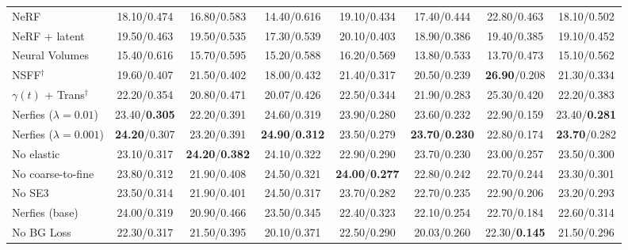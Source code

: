 \begin{enrichment}
\begin{enrichment}
\begin{table}[H]
{\begin{minipage}{0.80\textwidth}
{\begin{tabular}{@{}lccccccc@{}}
                            \midrule
                            NeRF~\cite{mildenhall2020_nerf}                 & 18.10/0.474 & 16.80/0.583 & 14.40/0.616 & 19.10/0.434 & 17.40/0.444 & 22.80/0.463 & 18.10/0.502 \\
                            NeRF + latent                                   & 19.50/0.463 & 19.50/0.535 & 17.30/0.539 & 20.10/0.403 & 18.90/0.386 & 19.40/0.385 & 19.10/0.452 \\
                            Neural Volumes~\cite{lombardi2019_neuralvolumes}& 15.40/0.616 & 15.70/0.595 & 15.20/0.588 & 16.20/0.569 & 13.80/0.533 & 13.70/0.473 & 15.10/0.562 \\
                            NSFF$^\dagger$~\cite{li2021_neural}             & 19.60/0.407 & 21.50/0.402 & 18.00/0.432  & 21.40/0.317 & 20.50/0.239 & \textbf{26.90}/0.208 & 21.30/0.334 \\
                            $\gamma(t)$ + Trans$^\dagger$~\cite{pumarola2021_dnerf}
                            & 22.20/0.354 & 20.80/0.471 & 20.07/0.426 & 22.50/0.344 & 21.90/0.283 & 25.30/0.420 & 22.20/0.383 \\
                            Nerfies ($\lambda{=}0.01$)                      & 23.40/\textbf{0.305} & 22.20/0.391 & 24.60/0.319 & 23.90/0.280 & 23.60/0.232 & 22.90/0.159 & 23.40/\textbf{0.281} \\
                            Nerfies ($\lambda{=}0.001$)                     & \textbf{24.20}/0.307 & 23.20/0.391 & \textbf{24.90}/\textbf{0.312} & 23.50/0.279 & \textbf{23.70}/\textbf{0.230} & 22.80/0.174 & \textbf{23.70}/0.282 \\
                            No elastic                                      & 23.10/0.317 & \textbf{24.20}/\textbf{0.382} & 24.10/0.322 & 22.90/0.290 & 23.70/0.230 & 23.00/0.257 & 23.50/0.300 \\
                            No coarse-to-fine                               & 23.80/0.312 & 21.90/0.408 & 24.50/0.321 & \textbf{24.00}/\textbf{0.277} & 22.80/0.242 & 22.70/0.244 & 23.30/0.301 \\
                            No SE3                                          & 23.50/0.314 & 21.90/0.401 & 24.50/0.317 & 23.70/0.282 & 22.70/0.235 & 22.90/0.206 & 23.20/0.293 \\
                            Nerfies (base)                                  & 24.00/0.319 & 20.90/0.466 & 23.50/0.345 & 22.40/0.323 & 22.10/0.254 & 22.70/0.184 & 22.60/0.314 \\
                            No BG Loss                                      & 22.30/0.317 & 21.50/0.395 & 20.10/0.371 & 22.50/0.290 & 20.03/0.260 & 22.30/\textbf{0.145} & 21.50/0.296 \\

\end{tabular}}
\end{minipage}}
\end{table}
\end{enrichment}
\end{enrichment}
